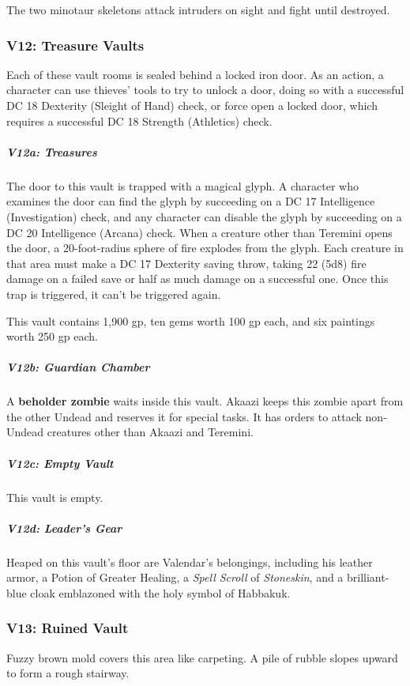 \documentclass[10pt,a4paper,twoside,bg=print,twocolumn,openany,nodeprecatedcode]{dndbook}
\begin{document}
The two minotaur skeletons attack intruders on sight and fight until destroyed.

\subsubsection{V12: Treasure Vaults}
Each of these vault rooms is sealed behind a locked iron door. As an action, a character can use thieves' tools to try to unlock a door, doing so with a successful DC 18 Dexterity (Sleight of Hand) check, or force open a locked door, which requires a successful DC 18 Strength (Athletics) check.

\subparagraph{V12a: Treasures}
The door to this vault is trapped with a magical glyph. A character who examines the door can find the glyph by succeeding on a DC 17 Intelligence (Investigation) check, and any character can disable the glyph by succeeding on a DC 20 Intelligence (Arcana) check. When a creature other than Teremini opens the door, a 20-foot-radius sphere of fire explodes from the glyph. Each creature in that area must make a DC 17 Dexterity saving throw, taking 22 (5d8) fire damage on a failed save or half as much damage on a successful one. Once this trap is triggered, it can't be triggered again.

This vault contains 1,900 gp, ten gems worth 100 gp each, and six paintings worth 250 gp each.

\subparagraph{V12b: Guardian Chamber}
A \textbf{beholder zombie} waits inside this vault. Akaazi keeps this zombie apart from the other Undead and reserves it for special tasks. It has orders to attack non-Undead creatures other than Akaazi and Teremini.

\subparagraph{V12c: Empty Vault}
This vault is empty.

\subparagraph{V12d: Leader's Gear}
Heaped on this vault's floor are Valendar's belongings, including his leather armor, a Potion of Greater Healing, a \textit{Spell Scroll} of \textit{Stoneskin}, and a brilliant-blue cloak emblazoned with the holy symbol of Habbakuk.

\subsubsection{V13: Ruined Vault}
\begin{DndReadAloud}{}
Fuzzy brown mold covers this area like carpeting. A pile of rubble slopes upward to form a rough stairway.

\end{DndReadAloud}
\end{document}
